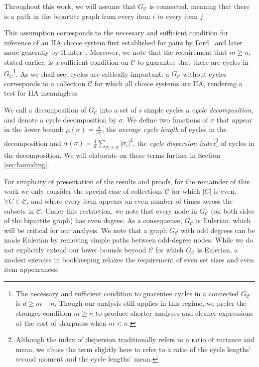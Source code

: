\documentclass[10pt]{article}
\begin{document}
\begin{ReviewVerbatim}
	Throughout this work, we will assume that $G_\mathcal{C}$ is connected, meaning that there is a path in the bipartite graph from every item $i$ to every item $j$.

	This assumption corresponds to the necessary and sufficient condition for inference of an IIA choice system first established for pairs by Ford~\cite{ford1957solution} and later more generally by Hunter~\cite{hunter2004mm}. Moreover, we note that the requirement that $m \geq n$, stated earlier, is a sufficient condition on $\mathcal{C}$ to guarantee that there are cycles in $G_\mathcal{C}$\footnote{The necessary and sufficient condition to guarentee cycles in a connected $G_\mathcal{C}$ is $d \geq m + n$. Though our analysis still applies in this regime, we prefer the stronger condition $m \geq n$ to produce shorter analyses and cleaner expressions at the cost of sharpness when $m < n$.}. As we shall see, cycles are critically important: a $G_\mathcal{C}$ without cycles corresponds to a collection $\mathcal{C}$ for which all choice systems are IIA, rendering a test for IIA meaningless.

	We call a decomposition of $G_\mathcal{C}$ into a set of $s$ simple cycles a {\it cycle decomposition}, and denote a cycle decomposition by $\sigma$. We define two functions of $\sigma$ that appear in the lower bound: $\mu(\sigma) = \frac{d}{|\sigma|}$, the \textit{average cycle length} of cycles in the decomposition and $\alpha(\sigma) = \frac{1}{d}\sum_{\sigma_i \in \sigma} |\sigma_i|^2$, the \textit{cycle dispersion index}\footnote{Although the index of dispersion traditionally refers to a ratio of variance and mean, we abuse the term slightly here to refer to a ratio of the cycle lengths' second moment and the cycle lengths' mean.} of cycles in the decomposition. We will elaborate on these terms further in Section \ref{sec:bounding}.

	For simplicity of presentation of the results and proofs, for the remainder of this work we only consider the special case of collections $\mathcal{C}$ for which $|C|$ is even, $\forall C \in \mathcal{C}$, and where every item appears an even number of times across the subsets in $\mathcal{C}$. Under this restriction, we note that every node in $G_\mathcal{C}$ (on both sides of the bipartite graph) has even degree. As a consequence, $G_\mathcal{C}$ is Eulerian, which will be critical for our analysis.
	We note that a graph $G_\mathcal{C}$ with odd degrees can be made Eulerian by removing simple paths between odd-degree nodes. While we do not explicitly extend our lower bounds beyond $\mathcal C$ for which $G_\mathcal{C}$ is Eulerian, a modest exercise in bookkeeping relaxes the requirement of even set sizes and even item appearances.


\end{ReviewVerbatim}
\end{document}
